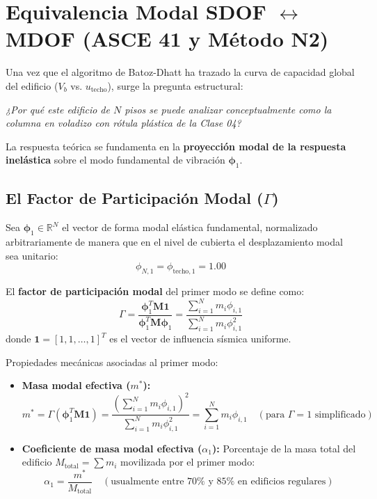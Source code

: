 \documentclass[11pt,letterpaper]{article}
\begin{document}
\section{Equivalencia Modal SDOF \texorpdfstring{$\longleftrightarrow$}{<->} MDOF (ASCE 41 y Método N2)}

Una vez que el algoritmo de Batoz-Dhatt ha trazado la curva de capacidad global del edificio ($V_b$ vs. $u_{\text{techo}}$), surge la pregunta estructural:
\begin{center}
    \textit{¿Por qué este edificio de $N$ pisos se puede analizar conceptualmente como la columna en voladizo con rótula plástica de la Clase 04?}
\end{center}

La respuesta teórica se fundamenta en la \textbf{proyección modal de la respuesta inelástica} sobre el modo fundamental de vibración $\bm{\phi}_1$.

\subsection{El Factor de Participación Modal (\texorpdfstring{$\Gamma$}{Gamma})}

Sea $\bm{\phi}_1 \in \mathbb{R}^N$ el vector de forma modal elástica fundamental, normalizado arbitrariamente de manera que en el nivel de cubierta el desplazamiento modal sea unitario:
\begin{equation}
    \phi_{N,1} = \phi_{\text{techo},1} = 1.00
\end{equation}

El \textbf{factor de participación modal} del primer modo se define como:
\begin{equation}
    \Gamma = \frac{\bm{\phi}_1^T \mathbf{M} \mathbf{1}}{\bm{\phi}_1^T \mathbf{M} \bm{\phi}_1} = \frac{\sum_{i=1}^N m_i \phi_{i,1}}{\sum_{i=1}^N m_i \phi_{i,1}^2}
    \label{eq:factor_gamma}
\end{equation}
donde $\mathbf{1} = [1, 1, \dots, 1]^T$ es el vector de influencia sísmica uniforme.

Propiedades mecánicas asociadas al primer modo:
\begin{itemize}
    \item \textbf{Masa modal efectiva ($m^*$):}
    \begin{equation}
        m^* = \Gamma \left(\bm{\phi}_1^T \mathbf{M} \mathbf{1}\right) = \frac{\left(\sum_{i=1}^N m_i \phi_{i,1}\right)^2}{\sum_{i=1}^N m_i \phi_{i,1}^2} = \sum_{i=1}^N m_i \phi_{i,1} \quad (\text{para } \Gamma = 1 \text{ simplificado})
    \end{equation}
    \item \textbf{Coeficiente de masa modal efectiva ($\alpha_1$):} Porcentaje de la masa total del edificio $M_{\text{total}} = \sum m_i$ movilizada por el primer modo:
    \begin{equation}
        \alpha_1 = \frac{m^*}{M_{\text{total}}} \quad (\text{usualmente entre } 70\% \text{ y } 85\% \text{ en edificios regulares})
    \end{equation}
\end{itemize}
\end{document}
